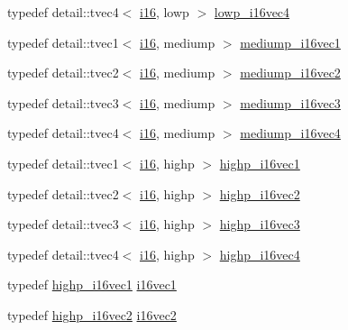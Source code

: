 \begin{CompactItemize}
\item 
typedef detail::tvec4$<$ \hyperlink{group__gtc__type__precision_g35e5542ca05b29cc256fdafb8503d1fd}{i16}, lowp $>$ \hyperlink{group__gtc__type__precision_g59ea63973187e1e990fb6633d1800c6d}{lowp\_\-i16vec4}
\item 
typedef detail::tvec1$<$ \hyperlink{group__gtc__type__precision_g35e5542ca05b29cc256fdafb8503d1fd}{i16}, mediump $>$ \hyperlink{group__gtc__type__precision_g6a1d37139ea8990de24edf4bfa3500ad}{mediump\_\-i16vec1}
\item 
typedef detail::tvec2$<$ \hyperlink{group__gtc__type__precision_g35e5542ca05b29cc256fdafb8503d1fd}{i16}, mediump $>$ \hyperlink{group__gtc__type__precision_g664a0266910df3c2d6559651f94d32e6}{mediump\_\-i16vec2}
\item 
typedef detail::tvec3$<$ \hyperlink{group__gtc__type__precision_g35e5542ca05b29cc256fdafb8503d1fd}{i16}, mediump $>$ \hyperlink{group__gtc__type__precision_gd9e470f707da812fe454505c99035471}{mediump\_\-i16vec3}
\item 
typedef detail::tvec4$<$ \hyperlink{group__gtc__type__precision_g35e5542ca05b29cc256fdafb8503d1fd}{i16}, mediump $>$ \hyperlink{group__gtc__type__precision_gd9aca299fc3e96c84be6b063381c9f3e}{mediump\_\-i16vec4}
\item 
typedef detail::tvec1$<$ \hyperlink{group__gtc__type__precision_g35e5542ca05b29cc256fdafb8503d1fd}{i16}, highp $>$ \hyperlink{group__gtc__type__precision_g0ed3103e2d3acb4efbe313add4243a72}{highp\_\-i16vec1}
\item 
typedef detail::tvec2$<$ \hyperlink{group__gtc__type__precision_g35e5542ca05b29cc256fdafb8503d1fd}{i16}, highp $>$ \hyperlink{group__gtc__type__precision_g74df9e215c049f82d277473c4c974bb4}{highp\_\-i16vec2}
\item 
typedef detail::tvec3$<$ \hyperlink{group__gtc__type__precision_g35e5542ca05b29cc256fdafb8503d1fd}{i16}, highp $>$ \hyperlink{group__gtc__type__precision_g8dcfd412bd9ce99a1cf5c2b6e50f07e7}{highp\_\-i16vec3}
\item 
typedef detail::tvec4$<$ \hyperlink{group__gtc__type__precision_g35e5542ca05b29cc256fdafb8503d1fd}{i16}, highp $>$ \hyperlink{group__gtc__type__precision_g7fd6f1b3c224833cc330a2c64b6994dd}{highp\_\-i16vec4}
\item 
typedef \hyperlink{group__gtc__type__precision_g0ed3103e2d3acb4efbe313add4243a72}{highp\_\-i16vec1} \hyperlink{group__gtc__type__precision_ga3a2fe05ca6a7086c5580922ebda4bf3}{i16vec1}
\item 
typedef \hyperlink{group__gtc__type__precision_g74df9e215c049f82d277473c4c974bb4}{highp\_\-i16vec2} \hyperlink{group__gtc__type__precision_g13f7a88281faec6a72231dce73ce6129}{i16vec2}

\end{CompactItemize}
